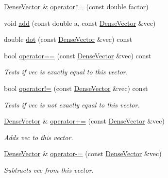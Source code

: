\begin{DoxyCompactItemize}
\mbox{\hyperlink{classfemus_1_1_dense_vector}{Dense\+Vector}} \& \mbox{\hyperlink{classfemus_1_1_dense_vector_aa332a79a955cacb506546a7ca0d00894}{operator$\ast$=}} (const double factor)
\item 
void \mbox{\hyperlink{classfemus_1_1_dense_vector_a945b0914e85311e7bcd7c2535818275e}{add}} (const double a, const \mbox{\hyperlink{classfemus_1_1_dense_vector}{Dense\+Vector}} \&vec)
\item 
double \mbox{\hyperlink{classfemus_1_1_dense_vector_a0a9fd31e853459449f244fe6c6ce4e62}{dot}} (const \mbox{\hyperlink{classfemus_1_1_dense_vector}{Dense\+Vector}} \&vec) const
\item 
bool \mbox{\hyperlink{classfemus_1_1_dense_vector_ad9545b4fb57e917ddd65d72ec7a653ff}{operator==}} (const \mbox{\hyperlink{classfemus_1_1_dense_vector}{Dense\+Vector}} \&vec) const
\begin{DoxyCompactList}\small\item\em Tests if {\ttfamily vec} is exactly equal to this vector. \end{DoxyCompactList}\item 
bool \mbox{\hyperlink{classfemus_1_1_dense_vector_a3b6851d83e3aa0c435213ccad05cd949}{operator!=}} (const \mbox{\hyperlink{classfemus_1_1_dense_vector}{Dense\+Vector}} \&vec) const
\begin{DoxyCompactList}\small\item\em Tests if {\ttfamily vec} is not exactly equal to this vector. \end{DoxyCompactList}\item 
\mbox{\hyperlink{classfemus_1_1_dense_vector}{Dense\+Vector}} \& \mbox{\hyperlink{classfemus_1_1_dense_vector_ac4db2e76d3e4750f8585d6ed03ef2800}{operator+=}} (const \mbox{\hyperlink{classfemus_1_1_dense_vector}{Dense\+Vector}} \&vec)
\begin{DoxyCompactList}\small\item\em Adds {\ttfamily vec} to this vector. \end{DoxyCompactList}\item 
\mbox{\hyperlink{classfemus_1_1_dense_vector}{Dense\+Vector}} \& \mbox{\hyperlink{classfemus_1_1_dense_vector_a1f66784d89711fd43a7a3193d23b177a}{operator-\/=}} (const \mbox{\hyperlink{classfemus_1_1_dense_vector}{Dense\+Vector}} \&vec)
\begin{DoxyCompactList}\small\item\em Subtracts {\ttfamily vec} from this vector. \end{DoxyCompactList}\item 

\end{DoxyCompactItemize}
